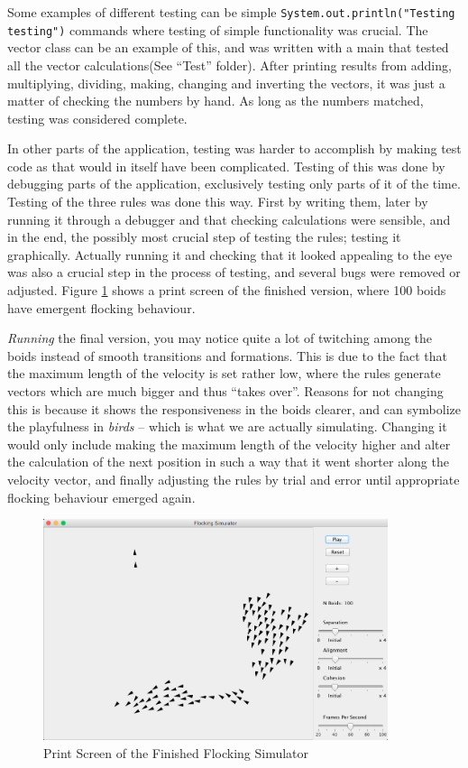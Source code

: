 \documentclass[a4paper,twoside, 10pt]{report}
\newcommand{\code}[1]{\texttt{#1}}
\begin{document}
Some examples of different testing can be simple \code{System.out.println("Testing testing")} commands where testing of simple functionality was crucial. The vector class can be an example of this, and was written with a main that tested all the vector calculations(See ``Test'' folder).  After printing results from adding, multiplying, dividing, making, changing and inverting the vectors, it was just a matter of checking the numbers by hand. As long as the numbers matched, testing was considered complete.

In other parts of the application, testing was harder to accomplish by making test code as that would in itself have been complicated. Testing of this was done by debugging parts of the application, exclusively testing only parts of it of the time. Testing of the three rules was done this way. First by writing them, later by running it through a debugger and that checking calculations were sensible, and in the end, the possibly most crucial step of testing the rules; testing it graphically. Actually running it and checking that it looked appealing to the eye was also a crucial step in the process of testing, and several bugs were removed or adjusted. Figure \ref{fig:finalversion} shows a print screen of the finished version, where 100 boids have emergent flocking behaviour.

\textit{Running} the final version, you may notice quite a lot of twitching among the boids instead of smooth transitions and formations. This is due to the fact that the maximum length of the velocity is set rather low, where the rules generate vectors which are much bigger and thus ``takes over''. Reasons for not changing this is because it shows the responsiveness in the boids clearer, and can symbolize the playfulness in \textit{birds} -- which is what we are actually simulating. Changing it would only include making the maximum length of the velocity higher and alter the calculation of the next position in such a way that it went shorter along the velocity vector, and finally adjusting the rules by trial and error until appropriate flocking behaviour emerged again.

\begin{figure}[H]
	\centering
    \includegraphics[width=0.9\textwidth]{images/FlockingSimulator.png}
    \caption{Print Screen of the Finished Flocking Simulator}
    \label{fig:finalversion}
\end{figure}
\end{document}
